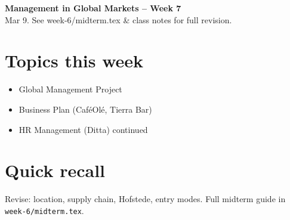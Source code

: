 \documentclass[10pt,a4paper]{article}
\begin{document}
\begin{center}
{\large\bfseries\color{eublue} Management in Global Markets -- Week 7}\\[0.2em]
\footnotesize Mar 9. See week-6/midterm.tex \& class notes for full revision.
\end{center}\vspace{0.5em}

\section*{\color{eublue}Topics this week}
\begin{itemize}
\item Global Management Project
\item Business Plan (Caf\'eOl\'e, Tierra Bar)
\item HR Management (Ditta) continued
\end{itemize}

\section*{Quick recall}
Revise: location, supply chain, Hofstede, entry modes. Full midterm guide in \texttt{week-6/midterm.tex}.
\end{document}
